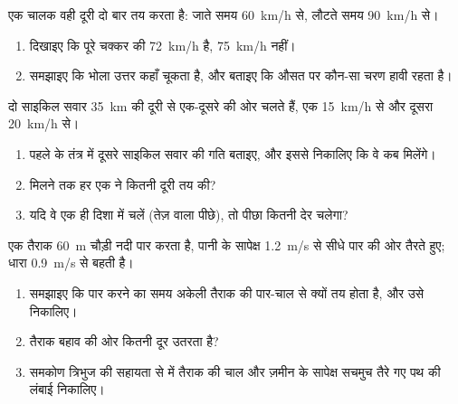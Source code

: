 \begin{exercise}[$\star\star\star$]\label{exo:g10:relative-motion:12}
एक चालक वही दूरी दो बार तय करता है: जाते समय \qty{60}{km/h} से, लौटते समय
\qty{90}{km/h} से।
\begin{enumerate}
  \item दिखाइए कि पूरे चक्कर की  \qty{72}{km/h} है, \qty{75}{km/h}
        नहीं।
  \item समझाइए कि भोला उत्तर कहाँ चूकता है, और बताइए कि औसत पर कौन-सा
        चरण हावी रहता है।
\end{enumerate}
\end{exercise}

\begin{exercise}[$\star\star\star$]\label{exo:g10:relative-motion:13}
दो साइकिल सवार \qty{35}{km} की दूरी से एक-दूसरे की ओर चलते हैं, एक \qty{15}{km/h}
से और दूसरा \qty{20}{km/h} से।
\begin{enumerate}
  \item पहले के तंत्र में दूसरे साइकिल सवार की गति बताइए, और इससे
        निकालिए कि वे कब मिलेंगे।
  \item मिलने तक हर एक ने कितनी दूरी तय की?
  \item यदि वे एक ही दिशा में चलें (तेज़ वाला पीछे), तो पीछा कितनी देर
        चलेगा?
\end{enumerate}
\end{exercise}

\begin{exercise}[$\star\star\star$]\label{exo:g10:relative-motion:14}
एक तैराक \qty{60}{m} चौड़ी नदी पार करता है, पानी के सापेक्ष \qty{1.2}{m/s} से सीधे
पार की ओर तैरते हुए; धारा \qty{0.9}{m/s} से बहती है।
\begin{enumerate}
  \item समझाइए कि पार करने का समय अकेली तैराक की पार-चाल से क्यों तय
        होता है, और उसे निकालिए।
  \item तैराक बहाव की ओर कितनी दूर उतरता है?
  \item समकोण त्रिभुज की सहायता से  में तैराक
        की चाल और ज़मीन के सापेक्ष सचमुच तैरे गए पथ की लंबाई निकालिए।
\end{enumerate}
\end{exercise}

